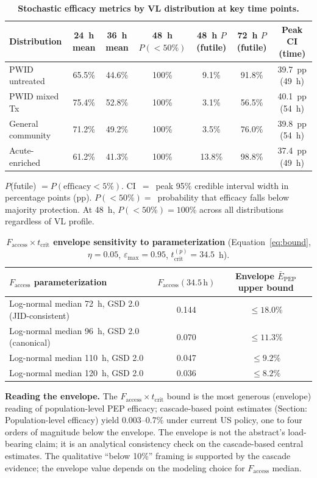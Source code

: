 \documentclass[10pt,letterpaper]{article}
\theoremstyle{definition}
\theoremstyle{remark}
\newcommand{\Ebarpep}{\bar{E}_{\text{PEP}}}
\newcommand{\Faccess}{F_{\text{access}}}
\newcommand{\tcrit}{t_{\text{crit}}}
\newcommand{\emax}{\varepsilon_{\max}}
\begin{document}
\begin{table}[!ht]
\centering
\caption{\textbf{Stochastic efficacy metrics by VL distribution at key time points.}}
\label{tab:stochastic}
\small
\begin{tabular}{@{}lcccccc@{}}
\toprule
\textbf{Distribution} & \textbf{24~h mean} & \textbf{36~h mean} & \textbf{48~h $P(<50\%)$} & \textbf{48~h $P$(futile)} & \textbf{72~h $P$(futile)} & \textbf{Peak CI (time)} \\
\midrule
PWID untreated      & 65.5\% & 44.6\% & 100\% & 9.1\%  & 91.8\% & 39.7~pp (49~h) \\
PWID mixed Tx       & 75.4\% & 52.8\% & 100\% & 3.1\%  & 56.5\% & 40.1~pp (54~h) \\
General community   & 71.2\% & 49.2\% & 100\% & 3.5\%  & 76.0\% & 39.8~pp (54~h) \\
Acute-enriched      & 61.2\% & 41.3\% & 100\% & 13.8\% & 98.8\% & 37.4~pp (49~h) \\
\bottomrule
\end{tabular}

\vspace{0.3em}
\footnotesize
$P$(futile) $= P(\text{efficacy} < 5\%)$. CI~$=$~peak 95\% credible interval width in percentage points (pp). $P(<50\%) =$~probability that efficacy falls below majority protection. At 48~h, $P(<50\%) = 100\%$ across all distributions regardless of VL profile.
\end{table}

\begin{table}[!ht]
\centering
\caption{\textbf{$\Faccess \times \tcrit$ envelope sensitivity to parameterization} (Equation~\ref{eq:bound}, $\eta = 0.05$, $\emax = 0.95$, $\tcrit^{(p)} = 34.5$~h).}
\label{tab:bound}
\small
\begin{tabular}{@{}lcc@{}}
\toprule
\textbf{$\Faccess$ parameterization} & \textbf{$\Faccess(34.5\,\text{h})$} & \textbf{Envelope $\Ebarpep$ upper bound} \\
\midrule
Log-normal median 72~h, GSD 2.0 (JID-consistent)  & 0.144 & $\leq 18.0\%$ \\
Log-normal median 96~h, GSD 2.0 (canonical)       & 0.070 & $\leq 11.3\%$ \\
Log-normal median 110~h, GSD 2.0                  & 0.047 & $\leq 9.2\%$  \\
Log-normal median 120~h, GSD 2.0                  & 0.036 & $\leq 8.2\%$  \\
\bottomrule
\end{tabular}

\vspace{0.3em}
\footnotesize
\textbf{Reading the envelope.} The $\Faccess \times \tcrit$ bound is the most generous (envelope) reading of population-level PEP efficacy; cascade-based point estimates (Section: Population-level efficacy) yield 0.003--0.7\% under current US policy, one to four orders of magnitude below the envelope. The envelope is not the abstract's load-bearing claim; it is an analytical consistency check on the cascade-based central estimates. The qualitative ``below 10\%'' framing is supported by the cascade evidence; the envelope value depends on the modeling choice for $\Faccess$ median.
\end{table}
\end{document}

